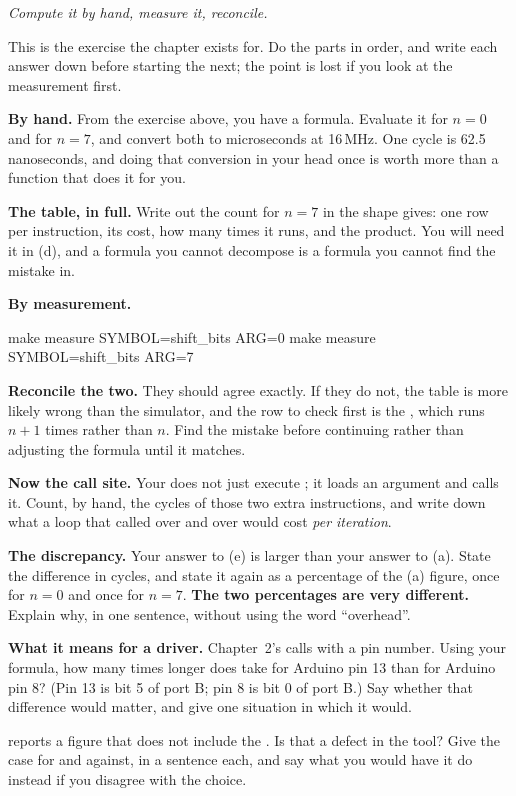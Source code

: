 \label{c1:ex:crosscheck}
\emph{Compute it by hand, measure it, reconcile.}

This is the exercise the chapter exists for. Do the parts in order, and write each answer down
before starting the next; the point is lost if you look at the measurement first.
\begin{parts}
  \item \textbf{By hand.} From the exercise above, you have a formula. Evaluate it for $n = 0$ and
    for $n = 7$, and convert both to microseconds at 16\,MHz. One cycle is 62.5 nanoseconds, and
    doing that conversion in your head once is worth more than a function that does it for you.
  \item \textbf{The table, in full.} Write out the count for $n = 7$ in the shape
     gives: one row per instruction, its cost, how many times it runs, and the
    product. You will need it in (d), and a formula you cannot decompose is a formula you cannot
    find the mistake in.
  \item \textbf{By measurement.}
\begin{shell}
make measure SYMBOL=shift_bits ARG=0
make measure SYMBOL=shift_bits ARG=7
\end{shell}
  \item \textbf{Reconcile the two.} They should agree exactly. If they do not, the table is more
    likely wrong than the simulator, and the row to check first is the , which runs
    $n + 1$ times rather than $n$. Find the mistake before continuing rather than adjusting the
    formula until it matches.
  \item \textbf{Now the call site.} Your  does not just execute ;
    it loads an argument and calls it. Count, by hand, the cycles of those two extra instructions,
    and write down what a loop that called  over and over would cost \emph{per
    iteration}.
  \item \textbf{The discrepancy.} Your answer to (e) is larger than your answer to (a). State the
    difference in cycles, and state it again as a percentage of the (a) figure, once for $n = 0$
    and once for $n = 7$. \textbf{The two percentages are very different.} Explain why, in one
    sentence, without using the word ``overhead''.
  \item \textbf{What it means for a driver.} Chapter~2's  calls 
    with a pin number. Using your formula, how many times longer does  take for
    Arduino pin 13 than for Arduino pin 8? (Pin 13 is bit 5 of port B; pin 8 is bit 0 of port B.)
    Say whether that difference would matter, and give one situation in which it would.
  \item {} reports a figure that does not include the . Is that a
    defect in the tool? Give the case for and against, in a sentence each, and say what you would
    have it do instead if you disagree with the choice.
\end{parts}
